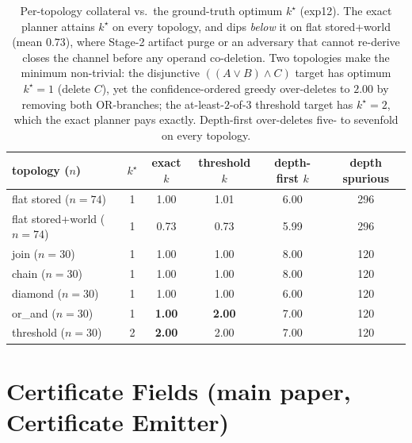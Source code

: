 \documentclass[11pt]{article}
\begin{document}
\begin{table}[h]
\centering
\begin{tabular}{@{}lccccc@{}}
\toprule
topology ($n$) & $k^\star$ & exact $k$ & threshold $k$ & depth-first $k$ & depth spurious \\
\midrule
flat stored ($n{=}74$)        & 1 & 1.00 & 1.01 & 6.00 & 296 \\
flat stored+world ($n{=}74$)  & 1 & 0.73 & 0.73 & 5.99 & 296 \\
join ($n{=}30$)               & 1 & 1.00 & 1.00 & 8.00 & 120 \\
chain ($n{=}30$)              & 1 & 1.00 & 1.00 & 8.00 & 120 \\
diamond ($n{=}30$)            & 1 & 1.00 & 1.00 & 6.00 & 120 \\
or\_and ($n{=}30$)            & 1 & \textbf{1.00} & \textbf{2.00} & 7.00 & 120 \\
threshold ($n{=}30$)          & 2 & \textbf{2.00} & 2.00 & 7.00 & 120 \\
\bottomrule
\end{tabular}
\caption{Per-topology collateral vs.\ the ground-truth optimum $k^\star$ (exp12). The
exact planner attains $k^\star$ on every topology, and dips \emph{below} it on flat
stored+world (mean $0.73$), where Stage-2 artifact purge or an adversary that cannot
re-derive closes the channel before any operand co-deletion. Two topologies make the
minimum non-trivial: the disjunctive $((A\vee B)\wedge C)$ target has optimum
$k^\star{=}1$ (delete $C$), yet the confidence-ordered greedy over-deletes to $2.00$ by
removing both OR-branches; the at-least-$2$-of-$3$ threshold target has $k^\star{=}2$,
which the exact planner pays exactly. Depth-first over-deletes five- to sevenfold on
every topology.}
\end{table}

\section{Certificate Fields (main paper, Certificate Emitter)}
\end{document}

